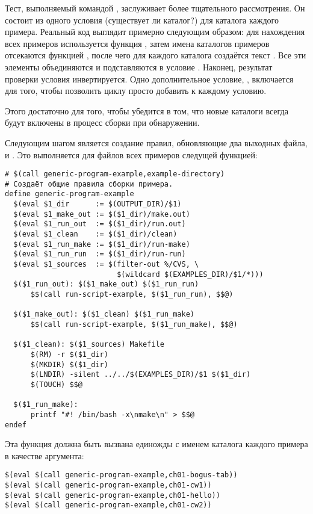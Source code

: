 Тест, выполняемый командой , заслуживает более тщательного
рассмотрения. Он состоит из одного условия  (существует ли
каталог?) для каталога каждого примера. Реальный код выглядит примерно
следующим образом: для нахождения всех примеров используется функция
, затем имена каталогов примеров отсекаются
функцией , после чего для каждого каталога создаётся
текст . Все эти
элементы объединяются и подставляются в условие . Наконец, результат проверки условия
инвертируется. Одно дополнительное условие, , включается
для того, чтобы позволить циклу  просто добавить
\command{\&\&} к каждому условию.

Этого достаточно для того, чтобы убедится в том, что новые каталоги
всегда будут включены в процесс сборки при обнаружении.

Следующим шагом является создание правил, обновляющие два выходных
файла,  и . Это выполняется для
 файлов всех примеров следущей функцией:

\begin{verbatim}
# $(call generic-program-example,example-directory)
# Создаёт общие правила сборки примера.
define generic-program-example
  $(eval $1_dir      := $(OUTPUT_DIR)/$1)
  $(eval $1_make_out := $($1_dir)/make.out)
  $(eval $1_run_out  := $($1_dir)/run.out)
  $(eval $1_clean    := $($1_dir)/clean)
  $(eval $1_run_make := $($1_dir)/run-make)
  $(eval $1_run_run  := $($1_dir)/run-run)
  $(eval $1_sources  := $(filter-out %/CVS, \
                          $(wildcard $(EXAMPLES_DIR)/$1/*)))
  $($1_run_out): $($1_make_out) $($1_run_run)
      $$(call run-script-example, $($1_run_run), $$@)

  $($1_make_out): $($1_clean) $($1_run_make)
      $$(call run-script-example, $($1_run_make), $$@)

  $($1_clean): $($1_sources) Makefile
      $(RM) -r $($1_dir)
      $(MKDIR) $($1_dir)
      $(LNDIR) -silent ../../$(EXAMPLES_DIR)/$1 $($1_dir)
      $(TOUCH) $$@

  $($1_run_make):
      printf "#! /bin/bash -x\nmake\n" > $$@
endef
\end{verbatim}

Эта функция должна быть вызвана единожды с именем каталога каждого
примера в качестве аргумента:

\begin{verbatim}
$(eval $(call generic-program-example,ch01-bogus-tab))
$(eval $(call generic-program-example,ch01-cw1))
$(eval $(call generic-program-example,ch01-hello))
$(eval $(call generic-program-example,ch01-cw2))
\end{verbatim}


